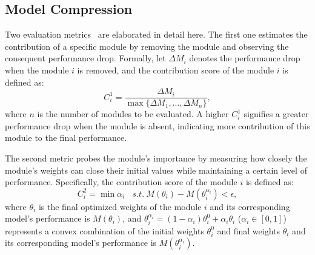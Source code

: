\documentclass[letterpaper]{article} %
\begin{document}
\subsection{Model Compression}
\label{MMC}
Two evaluation metrics~\cite{wang2020rethinking} are elaborated in detail here.
The first one estimates the contribution of a specific module by removing the module and observing the consequent performance drop.
Formally, let $\Delta{M}_i$ denotes the performance drop when the module $i$ is removed, and the contribution score of the module $i$ is defined as:
\begin{equation}
    C^{\mathrm{1}}_i = \frac{\Delta{M}_i}{\max\{\Delta{M}_1, \dots, \Delta{M}_n\}},
\end{equation}
where $n$ is the number of modules to be evaluated.
A higher $C^{\mathrm{1}}_i$ signifies a greater performance drop when the module is absent, indicating more contribution of this module to the final performance.

The second metric probes the module's importance by measuring how closely the module's weights can close their initial values while maintaining a certain level of performance. Specifically, the contribution score of the module $i$ is defined as:
\begin{equation}
     C^{\mathrm{2}}_i = \min \alpha_i ~~~~  s.t. ~ M(\theta_i)-M(\theta_i^{\alpha_i}) < \epsilon,
     \label{eq:C2}
\end{equation}
where $\theta_i$ is the final optimized weights of the module $i$ and its corresponding model's performance is $M(\theta_i)$, and $\theta_i^{\alpha_i}= (1-\alpha_i)\theta_i^0 + \alpha_i \theta_i$ ($\alpha_i \in [0,1]$) represents a convex combination of the initial weights $\theta_i^0$ and final weights $\theta_i$ and its corresponding model's performance is $M(\theta_i^{\alpha_i})$.

\end{document}
